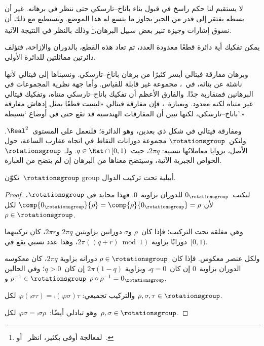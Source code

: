 \documentclass[../../../include/open-logic-section]{subfiles}
\begin{document}

لا يستقيم لنا حكم راسخ في قبول بناء باناخ--تارسكي حتى ننظر في برهانه.
غير أن بسطه يفتقر إلى قدر من الجبر يجاوز ما يتسع له هذا الموضع. ونستطيع
مع ذلك أن نسوق إشارات وجيزة تنير بعض سبيل البرهان،\footnote{لمعالجة
أوفى بكثير، انظر~\cite{Weston2003} أو~\cite{Wagon2016}.} وذلك بالنظر
في النتيجة الآتية.

\begin{thm}
يمكن تفكيك أية دائرة قطعًا معدودة العدد، ثم تعاد هذه القطع، بالدوران
والإزاحة، فتؤلف دائرتين مماثلتين للدائرة الأولى.
\end{thm}

وبرهان مفارقة فيتالي أيسر كثيرًا من برهان باناخ--تارسكي. ونسبناها إلى
فيتالي لأنها ناشئة عن بنائه، في~\citeyear{Vitali1905}، مجموعة غير
قابلة للقياس. وأما جهة نظرية المجموعات في البرهانين فمتقاربة جدًا.
والفارق الأعظم أن تفكيك باناخ--تارسكي متناه، وتفكيك فيتالي غير متناه
لكنه معدود. وبعبارة~\citet{Weston2003}، فإن مفارقة فيتالي «ليست
قطعًا بمثل إدهاش مفارقة باناخ--تارسكي، لكنها تبين أن المفارقات
الهندسية قد تقع حتى في أوضاع `بسيطة'.»

ومفارقة فيتالي في شكل ذي بعدين، وهو الدائرة؛ فلنعمل على
المستوى~$\Real^2$. ولتكن~$\rotationsgroup$ مجموعة دورانات النقاط في
اتجاه عقارب الساعة، حول الأصل، بزوايا معاملاتُها نسبية:
$2\pi q$، حيث~$q \in \Rat \cap [0,1)$. ولـ~$\rotationsgroup$ الخواص
الجبرية الآتية، وسيتضح معناها من البرهان إن لم يتضح من العبارة.

\begin{lem}
تكوّن~$\rotationsgroup$ {group} أبيلية تحت تركيب الدوال.
\end{lem}

\begin{proof}
لنكتب~$0_{\rotationsgroup}$ للدوران بزاوية~$0$. فهذا محايد في
$\rotationsgroup$، لأن
$\comp{0_{\rotationsgroup}}{\rho} = \comp{\rho}{0_{\rotationsgroup}} =
\rho$ لكل~$\rho \in \rotationsgroup$.

وهي مغلقة تحت التركيب؛ فإذا كان~$\rho$ و$\sigma$ دورانين بزاويتين
$2\pi q$ و$2\pi r$، كان تركيبهما دورانًا بزاوية
$2\pi((q+r) \bmod 1)$، وهذا عدد نسبي يقع في~$[0,1)$.

ولكل عنصر معكوس. فإذا كان~$\rho \in \rotationsgroup$ دورانه بزاوية
$2\pi q$، كان معكوسه الدوران بزاوية~$0$ إن كان~$q=0$، وبزاوية
$2\pi(1-q)$ إن كان~$q>0$؛ وفي الحالين
$\rho^{-1} \in \rotationsgroup$ و
$\rho \circ \rho^{-1} = 0_\rotationsgroup$.

والتركيب تجميعي:
$\comp{\rho}{(\comp{\sigma}{\tau})} =
\comp{(\comp{\rho}{\sigma})}{\tau}$ لكل
$\rho, \sigma, \tau \in \rotationsgroup$.

وهو تبادلي أيضًا:~$\comp{\rho}{\sigma} =
\comp{\sigma}{\rho}$ لكل~$\rho, \sigma \in \rotationsgroup$.
\end{proof}
\end{document}
